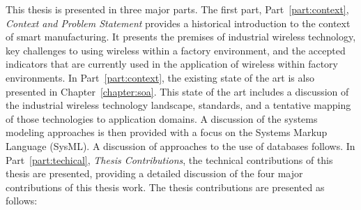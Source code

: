 This thesis is presented in three major parts.  The first part, Part~\ref{part:context}, \textit{Context and Problem Statement} provides a historical introduction to the context of smart manufacturing.  It presents the premises of industrial wireless technology, key challenges to using wireless within a factory environment, and the accepted indicators that are currently used in the application of wireless within factory environments. In Part~\ref{part:context}, the existing state of the art is also presented in Chapter~\ref{chapter:soa}.  This state of the art includes a discussion of the industrial wireless technology landscape, standards, and a tentative mapping of those technologies to application domains.  A discussion of the systems modeling approaches is then provided with a focus on the Systems Markup Language (SysML).  A discussion of approaches to the use of databases follows.  In Part~\ref{part:techical}, \textit{Thesis Contributions}, the technical contributions of this thesis are presented, providing a detailed discussion of the four major contributions of this thesis work.  The thesis contributions are presented as follows:

%	
%	
%	

